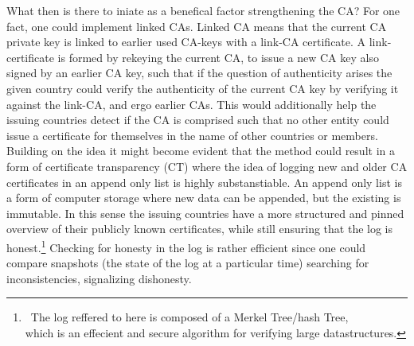 \documentclass[12pt,
               a4paper,
               article,
               oneside,
               oldfontcommands,
               english]{memoir}
\begin{document}
What then is there to iniate as a benefical factor strengthening the CA? For one fact, one could implement linked CAs. Linked CA means that the current CA private key is linked to earlier used CA-keys with a link-CA certificate. A link-certificate is formed by rekeying the current CA, to issue a new CA key also signed by an earlier CA key, such that if the question of authenticity arises the given country could verify the authenticity of the current CA key by verifying it against the link-CA, and ergo earlier CAs. This would additionally help the issuing countries detect if the CA is comprised such that no other entity could issue a certificate for themselves in the name of other countries or members. Building on the idea it might become evident that the method could result in a form of certificate transparency (CT) where the idea of logging new and older CA certificates in an append only list is highly substanstiable. An append only list is a form of computer storage where new data can be appended, but the existing is immutable. In this sense the issuing countries have a more structured and pinned overview of their publicly known certificates, while still ensuring that the log is honest.\footnote{ \ The log reffered to here is composed of a Merkel Tree/hash Tree,\\ which is an effecient and secure algorithm for verifying large datastructures.} Checking for honesty in the log is rather efficient since one could compare snapshots (the state of the log at a particular time) searching for inconsistencies, signalizing dishonesty.
\end{document}

